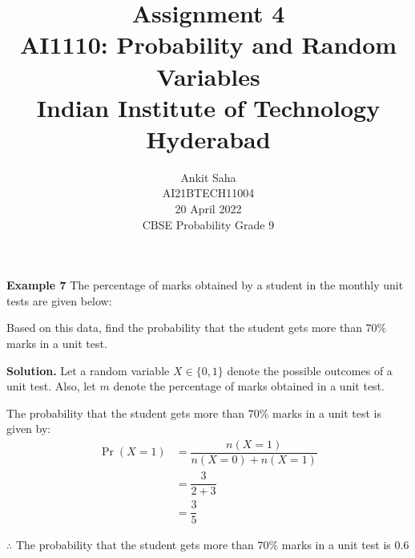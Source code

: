\documentclass[journal,12pt,twocolumn]{IEEEtran}
\title{Assignment 4 \\ \Large AI1110: Probability and Random Variables \\ \large Indian Institute of Technology Hyderabad}
\author{Ankit Saha \\ \normalsize AI21BTECH11004 \\ \vspace*{20pt} \normalsize  20 April 2022 \\ \vspace*{20pt} \Large CBSE Probability Grade 9}
\providecommand{\pr}[1]{\ensuremath{\Pr\left(#1\right)}}
\begin{document}
	\maketitle
	
	\textbf{Example 7} 
	The percentage of marks obtained by a student in the monthly unit tests are given below:
	\begin{table}[ht!]
		\centering
		
		\caption{}
		\label{table:table1}	
	\end{table}
	
	Based on this data, find the probability that the student gets more than $70\%$ marks in a unit test. 
	
	\textbf{Solution.}
	Let a random variable $X \in \{0,1\}$ denote 	the possible outcomes of a unit test. Also, let $m$ denote the percentage of marks obtained in a unit test.
	\begin{table}[ht!]
		\centering
		
		\caption{}
		\label{table:table2}	
	\end{table}
	
	The probability that the student gets more than $70\%$ marks in a unit test is given by:
	\begin{align}
	\pr{X = 1} &= \dfrac{n(X=1)}{n(X=0) + n(X=1)} \\
	&= \dfrac{3}{2+3} \\
	&= \dfrac{3}{5}
	\end{align}
	
	$\therefore$ The probability that the student gets more than $70\%$ marks in a unit test is $0.6$
	
\end{document}
